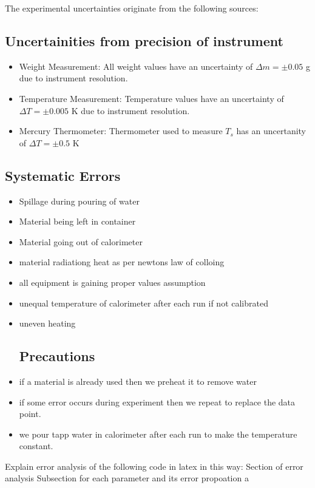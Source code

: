 \documentclass[%
 sor,
 jor,
 amsmath,amssymb,
 reprint,%
]{revtex4-2}
\begin{document}
The experimental uncertainties originate from the following sources:
\subsection{Uncertainities from precision of instrument}
\begin{itemize}
    \item Weight Measurement:
    All weight values have an uncertainty of $\Delta m = \pm 0.05$ \si{\gram} due to instrument resolution.    
    \item Temperature Measurement: 
    Temperature values have an uncertainty of $\Delta T = \pm 0.005$ \si{\kelvin} due to instrument resolution. 
\item Mercury Thermometer: Thermometer used to measure $T_s$ has an uncertanity of $\Delta T = \pm 0.5$ \si{\kelvin}
\end{itemize}

\subsection{Systematic Errors}
\begin{itemize}
\item Spillage during pouring of water
\item Material being left in container
\item Material going out of calorimeter
\item material radiationg heat as per newtons law of colloing
\item all equipment is gaining proper values assumption
\item unequal temperature of calorimeter after each run if not calibrated
\item  uneven heating 
\subsection*{Precautions}
\item if a material is already used then we preheat it  to remove water
\item if some error occurs during experiment then we repeat to replace the data point.
\item we pour tapp water in calorimeter after each run to make the temperature constant.
\end{itemize}

Explain error analysis of the following code in latex in this way: 
Section of error analysis
Subsection for each parameter and its error propoation a
\end{document}
